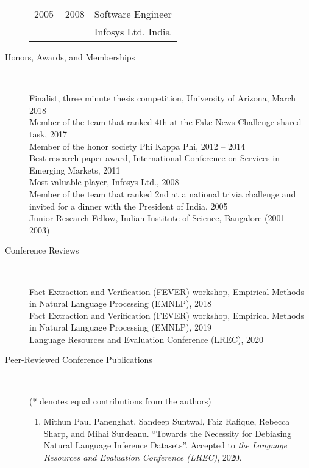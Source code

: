 \documentclass[10pt]{article}
\newcommand{\ve}[1]{{\em #1}} %
\newcommand{\ti}[1]{``#1''} %
\begin{document}
\begin{description}
\begin{tabular}{lp{4.9in}}
\hspace{-.2cm}2005 -- 2008 & Software Engineer	\\
& {\sc Infosys Ltd, India} 

\end{tabular}

\vspace{-.3cm}
\item [Honors, Awards, and Memberships]\

Finalist, three minute thesis competition, University of Arizona, March 2018\\
Member of the team that ranked 4th at the Fake News Challenge shared task, 2017\\
Member of the honor society Phi Kappa Phi, 2012 -- 2014\\
Best research paper award, International Conference on Services in Emerging Markets, 2011\\
Most valuable player,  Infosys  Ltd., 2008\\
Member of the team that ranked 2nd at a national trivia challenge and invited for a dinner with the President of India, 2005\\
Junior Research Fellow, Indian Institute of Science, Bangalore (2001 – 2003)\\




\vspace{-.4cm}\item [Conference Reviews]\ 

Fact Extraction and Verification (FEVER) workshop, Empirical Methods in Natural Language Processing (EMNLP), 2018\\
Fact Extraction and Verification (FEVER) workshop, Empirical Methods in Natural Language Processing (EMNLP), 2019\\
Language Resources and Evaluation Conference (LREC), 2020\\







\item [ Peer-Reviewed Conference Publications]\


(* denotes equal contributions from the authors)

\begin{enumerate}

\item Mithun Paul Panenghat, Sandeep Suntwal, Faiz Rafique, Rebecca Sharp, and Mihai Surdeanu.   \ti{Towards the Necessity for Debiasing Natural Language Inference Datasets}. Accepted to \ve{the Language Resources and Evaluation Conference (LREC)}, 2020.



\end{enumerate}
\end{description}
\end{document}
